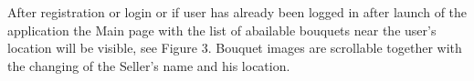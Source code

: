 \documentclass{scrreprt}
\begin{document}
After registration or login or if user has already been logged in after launch of the application the Main page with the list of abailable bouquets near the user's location will be visible, see Figure 3. Bouquet images are scrollable together with the changing of the Seller's name and his location.

\begin{figure}[h]
	\begin{minipage}[h]{0.32\linewidth}
	\end{minipage}
	\hfill
	\begin{minipage}[h]{0.32\linewidth}

\end{minipage}
\end{figure}
\end{document}

